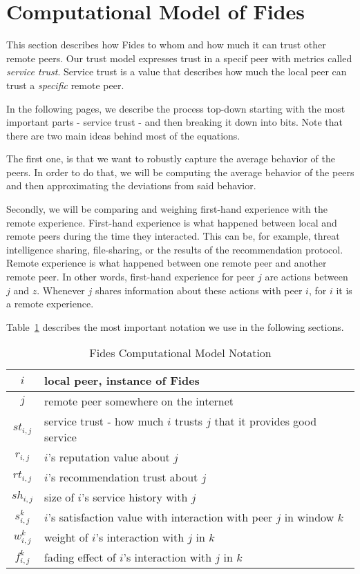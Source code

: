 \section{Computational Model of Fides}
\label{sec:computational-model}
This section describes how Fides to whom and how much it can trust other remote peers.
Our trust model expresses trust in a specif peer with metrics called \textit{service trust}.
Service trust is a value that describes how much the local peer can trust a \textit{specific} remote peer. 

In the following pages, we describe the process top-down starting with the most important parts - service trust - and then breaking it down into bits.
Note that there are two main ideas behind most of the equations. 

The first one, is that we want to robustly capture the average behavior of the peers. In order to do that, we will be computing the average behavior of the peers and then approximating the deviations from said behavior.

Secondly, we will be comparing and weighing first-hand experience with the remote experience. 
First-hand experience is what happened between local and remote peers during the time they interacted. This can be, for example, threat intelligence sharing, file-sharing, or the results of the recommendation protocol.
Remote experience is what happened between one remote peer and another remote peer. In other words, first-hand experience for peer $j$ are actions between $j$ and $z$. Whenever $j$ shares information about these actions with peer $i$, for $i$ it is a remote experience.

\vspace{0.5cm}

\noindent
Table~\ref{tab:notation-computational-model} describes the most important notation we use in the following sections.

\begin{table}[ht]
\centering
\begin{tabular}{ c | m{20em} }
 $i$ & local peer, instance of Fides \\
 \hline
 $j$ & remote peer somewhere on the internet \\
 \hline
 $st_{i, j}$ & service trust - how much $i$ trusts $j$ that it provides good service \\
 \hline
 $r_{i, j}$ & $i$'s reputation value about $j$ \\
 \hline
 $rt_{i, j}$ & $i$'s recommendation trust about $j$ \\
 \hline
 $sh_{i, j}$ & size of $i$'s service history with $j$ \\
 \hline
 $s^{k}_{i, j}$ & $i$'s satisfaction value with interaction with peer $j$ in window $k$\\
 \hline
 $w^{k}_{i, j}$ & weight of $i$'s interaction with $j$ in $k$ \\
 \hline
 $f^{k}_{i, j}$ & fading effect of $i$'s interaction with $j$ in $k$ \\
\end{tabular}
\caption{Fides Computational Model Notation}
\label{tab:notation-computational-model}
\end{table}

